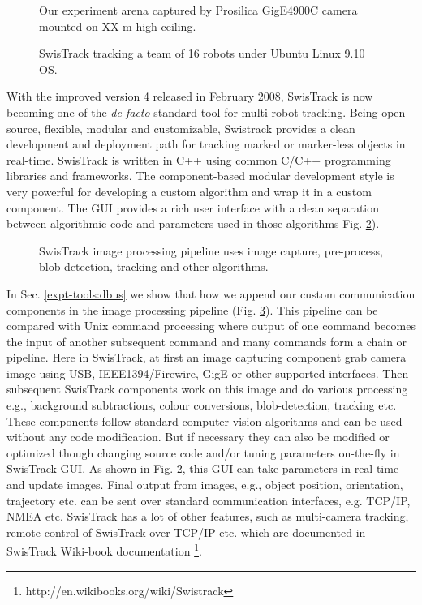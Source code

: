 \begin{figure}
\centering
\caption{Our experiment arena captured by Prosilica GigE4900C camera mounted on XX m high ceiling.}
\label{fig:expt-arena} %
\end{figure}
\begin{figure}
\centering
\caption{SwisTrack tracking a team of 16 robots under Ubuntu Linux 9.10 OS.}
\label{fig:swistrack-screenshot} 
\end{figure}
With the improved version 4 released in February 2008, SwisTrack is now becoming one of the {\em de-facto} standard tool for multi-robot tracking. Being open-source, flexible, modular and customizable, Swistrack provides a clean development and deployment path for tracking marked or marker-less objects in real-time. SwisTrack is written in C++ using common C/C++ programming libraries and frameworks. The component-based modular development style is very powerful for developing a custom algorithm and wrap it in a custom component. The GUI provides a rich user interface with a clean separation between algorithmic code and parameters used in those algorithms Fig. \ref{fig:swistrack-screenshot}).\\
\begin{figure}
\centering
\caption{SwisTrack image processing pipeline uses image capture, pre-process, blob-detection, tracking and other algorithms.}
\label{fig:swistrack-pipeline}
\end{figure}
In Sec. \ref{expt-tools:dbus} we show that how we append our custom communication components in the image processing pipeline (Fig. \ref{fig:swistrack-pipeline}). This pipeline can be compared with Unix command processing where output of one command becomes the input of another subsequent command and many commands form a chain or pipeline. Here in SwisTrack, at first an image capturing component grab camera image using USB, IEEE1394/Firewire, GigE or other supported interfaces. Then subsequent SwisTrack components work on this image and do various processing e.g., background subtractions, colour conversions, blob-detection, tracking etc. These components follow standard computer-vision algorithms and can be used without any code modification. But if necessary they can also be modified or optimized though changing source code and/or tuning parameters on-the-fly in SwisTrack GUI. As shown in Fig. \ref{fig:swistrack-screenshot}, this GUI can take parameters in real-time and update images. Final output from images, e.g., object position, orientation, trajectory etc. can be sent over standard communication interfaces, e.g. TCP/IP, NMEA etc. SwisTrack has a lot of other features, such as multi-camera tracking, remote-control of SwisTrack over TCP/IP etc. which are documented in SwisTrack Wiki-book documentation \footnote{http://en.wikibooks.org/wiki/Swistrack}.\\
